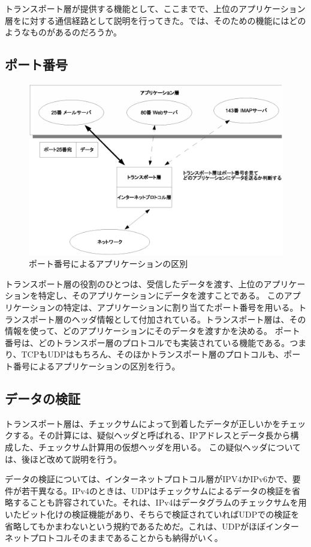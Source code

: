 トランスポート層が提供する機能として、ここまでで、上位のアプリケーション層をに対する通信経路として説明を行ってきた。では、そのための機能にはどのようなものがあるのだろうか。

\subsection{ポート番号}

\begin{figure}[htbp]
	\includegraphics[width=12cm,clip]{draw/portnumber.eps}
	\caption{ポート番号によるアプリケーションの区別}
	\label{fig:pseudo6}
\end{figure}

トランスポート層の役割のひとつは、受信したデータを渡す、上位のアプリケーションを特定し、そのアプリケーションにデータを渡すことである。
このアプリケーションの特定は、アプリケーションに割り当てたポート番号を用いる。トランスポート層のヘッダ情報として付加されている。トランスポート層は、その情報を使って、どのアプリケーションにそのデータを渡すかを決める。
ポート番号は、どのトランスポー層のプロトコルでも実装されている機能である。つまり、TCPもUDPはもちろん、そのほかトランスポート層のプロトコルも、ポート番号によるアプリケーションの区別を行う。

\subsection{データの検証}
トランスポート層は、チェックサムによって到着したデータが正しいかをチェックする。その計算には、疑似ヘッダと呼ばれる、IPアドレスとデータ長から構成した、チェックサム計算用の仮想ヘッダを用いる。
この疑似ヘッダについては、後ほど改めて説明を行う。

データの検証については、インターネットプロトコル層がIPV4かIPv6かで、要件が若干異なる。IPv4のときは、UDPはチェックサムによるデータの検証を省略することも許容されていた。それは、IPv4はデータグラムのチェックサムを用いたビット化けの検証機能があり、そちらで検証されていればUDPでの検証を省略してもかまわないという規約であるためだ。これは、UDPがほぼインターネットプロトコルそのままであることからも納得がいく。

